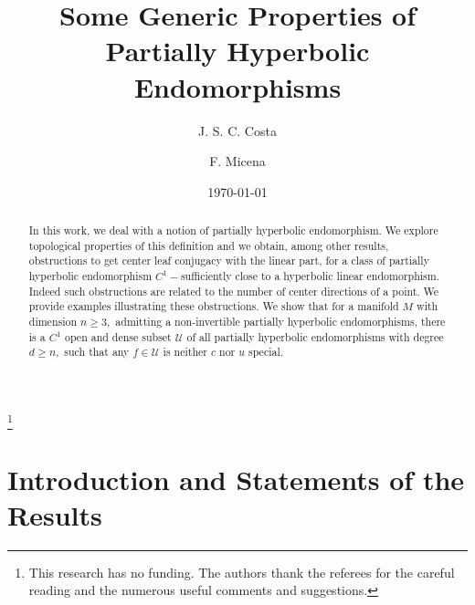 \documentclass[12pt,reqno]{amsart}
\numberwithin{equation}{section}
\theoremstyle{plain}
\theoremstyle{remark}
\begin{document}
\thanks{This research has no funding. The authors thank the referees for the careful reading and the numerous useful comments and suggestions.}

\author{J. S. C. Costa}
\address{DEMAT-UFMA S\~{a}o Lu\'{i}s-MA, Brazil.}


\author[F. Micena]{F. Micena}
\address{
  IMC-UNIFEI Itajub\'{a}-MG, Brazil.}








\renewcommand{\subjclassname}{\textup{2000} Mathematics Subject Classification}

\date{\today}

\setcounter{tocdepth}{2}



\title{Some Generic Properties of Partially Hyperbolic Endomorphisms}
\maketitle
\begin{abstract}
In this work, we deal with a notion of partially hyperbolic endomorphism. We explore topological properties of this definition and we obtain, among other results, obstructions to get center leaf conjugacy with the linear part, for a class of partially hyperbolic endomorphism $C^1-$sufficiently close to a hyperbolic linear endomorphism. Indeed such obstructions are related to the number of center directions of a point. We provide examples illustrating these obstructions.  We show that for a manifold $M$ with dimension $n \geq 3,$ admitting a non-invertible partially hyperbolic endomorphisms, there is a  $C^1$ open and dense subset $\mathcal{U}$ of all partially hyperbolic endomorphisms with degree $d \geq n,$ such that any $f \in \mathcal{U}$ is neither $c$ nor $u$ special.
\end{abstract}


\section{Introduction and Statements of the Results}\label{section.preliminaries}
\end{document}
